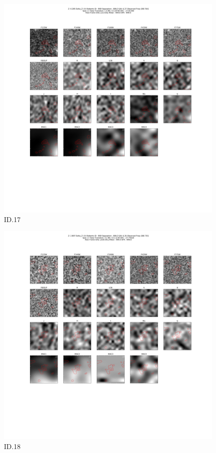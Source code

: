 \begin{figure}[tbp]
\centering \includegraphics[width=120mm]{Matched/ASPECS_Cutout_17.png}
\caption{ID.17}
\label{fig:Match_Three}
\end{figure}

\begin{figure}[tbp]
\centering \includegraphics[width=120mm]{Matched/ASPECS_Cutout_18.png}
\caption{ID.18}
\label{fig:Match_Three}
\end{figure}

